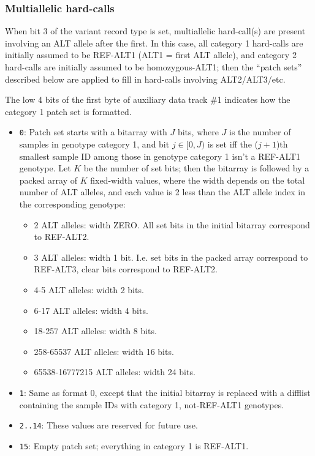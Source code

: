 \documentclass[8pt]{article}
\begin{document}
\subsubsection{Multiallelic hard-calls}

When bit 3 of the variant record type is set, multiallelic hard-call(s) are
present involving an ALT allele after the first.  In this case, all category 1
hard-calls are initially assumed to be REF-ALT1 (ALT1 = first ALT allele), and
category 2 hard-calls are initially assumed to be homozygous-ALT1; then the
``patch sets'' described below are applied to fill in hard-calls involving
ALT2/ALT3/etc.

The low 4 bits of the first byte of auxiliary data track \#1 indicates how the
category 1 patch set is formatted.

\begin{itemize}
\item \texttt{0}: Patch set starts with a bitarray with $J$ bits, where $J$ is
  the number of samples in genotype category 1, and bit $j\in [0, J)$ is set
  iff the ($j+1$)th smallest sample ID among those in genotype category 1 isn't
  a REF-ALT1 genotype.  Let $K$ be the number of set bits; then the bitarray is
  followed by a packed array of $K$ fixed-width values, where the width depends
  on the total number of ALT alleles, and each value is 2 less than the ALT
  allele index in the corresponding genotype:
  \begin{itemize}
  \item 2 ALT alleles: width ZERO.  All set bits in the initial bitarray
    correspond to REF-ALT2.
  \item 3 ALT alleles: width 1 bit.  I.e. set bits in the packed array
    correspond to REF-ALT3, clear bits correspond to REF-ALT2.
  \item 4-5 ALT alleles: width 2 bits.
  \item 6-17 ALT alleles: width 4 bits.
  \item 18-257 ALT alleles: width 8 bits.
  \item 258-65537 ALT alleles: width 16 bits.
  \item 65538-16777215 ALT alleles: width 24 bits.
  \end{itemize}
\item \texttt{1}: Same as format 0, except that the initial bitarray is
  replaced with a difflist containing the sample IDs with category 1,
  not-REF-ALT1 genotypes.
\item \texttt{2..14}: These values are reserved for future use.
\item \texttt{15}: Empty patch set; everything in category 1 is REF-ALT1.
\end{itemize}
\end{document}
